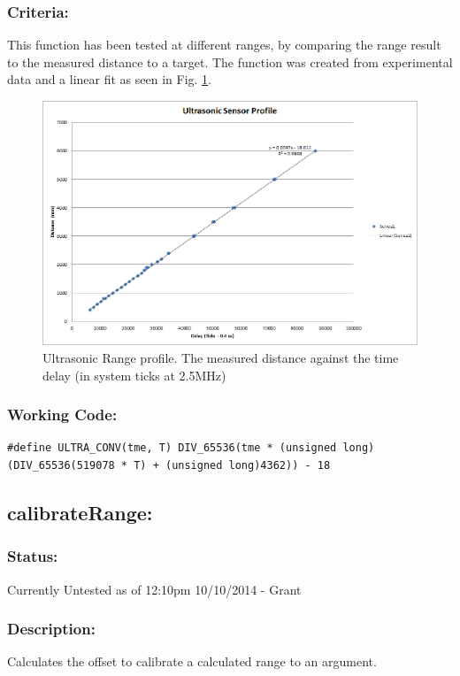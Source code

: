 \documentclass[]{report}
\begin{document}
\subsubsection{Criteria:}
This function has been tested at different ranges, by comparing the range result to the measured distance to a target. The function was created from experimental data and a linear fit as seen in Fig. \ref{fig:UltrasonicProfile}.

\begin{figure}
\centering
\includegraphics[width=0.7\linewidth]{"Ultrasonic Profile"}
\caption{Ultrasonic Range profile. The measured distance against the time delay (in system ticks at 2.5MHz)}
\label{fig:UltrasonicProfile}
\end{figure}

\subsubsection{Working Code:}
\begin{lstlisting}
#define ULTRA_CONV(tme, T) DIV_65536(tme * (unsigned long)(DIV_65536(519078 * T) + (unsigned long)4362)) - 18
\end{lstlisting}


\subsection{calibrateRange:}
\subsubsection{Status:}
Currently Untested as of 12:10pm 10/10/2014 - Grant

\subsubsection{Description:}
Calculates the offset to calibrate a calculated range to an argument.
\end{document}
